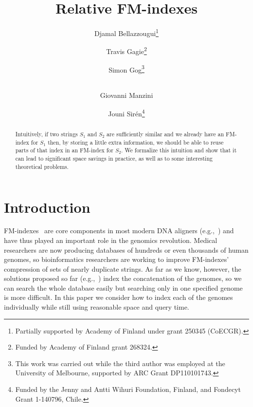 \documentclass{llncs}
\begin{document}
\title{Relative FM-indexes}

\author{Djamal Bellazzougui\fnmsep\thanks{Partially supported by Academy of Finland under grant 250345 (CoECGR).} \and Travis Gagie\fnmsep\thanks{Funded by Academy of Finland grant 268324.} \and Simon Gog\fnmsep\thanks{This work was carried out while the third author was employed at the University of Melbourne, supported by ARC Grant DP110101743.} \and\\
Giovanni Manzini \and Jouni Sir\'en\fnmsep\thanks{Funded by the Jenny and Antti Wihuri Foundation, Finland, and Fondecyt Grant 1-140796, Chile.}}

\maketitle

\begin{abstract}
Intuitively, if two strings $S_1$ and $S_2$ are sufficiently similar and we already have an FM-index for $S_1$ then, by storing a little extra information, we should be able to reuse parts of that index in an FM-index for $S_2$.  We formalize this intuition and show that it can lead to significant space savings in practice, as well as to some interesting theoretical problems.
\end{abstract}


\section{Introduction} \label{sec:introduction}

FM-indexes~\cite{FM05} are core components in most modern DNA aligners
(e.g.,~\cite{LTPS09,LD09,LYLLYKW09}) and have thus played an important role
in the genomics revolution.  Medical researchers are now producing databases
of hundreds or even thousands of human genomes, so bioinformatics researchers
are working to improve FM-indexes' compression of sets of nearly duplicate
strings.  As far as we know, however, the solutions proposed so far
(e.g.,~\cite{FGHP14,MNSV10}) index the concatenation of the genomes, so we
can search the whole database easily but searching only in one specified
genome is more difficult.  In this paper we consider how to index each of the
genomes individually while still using reasonable space and query time.
\end{document}
